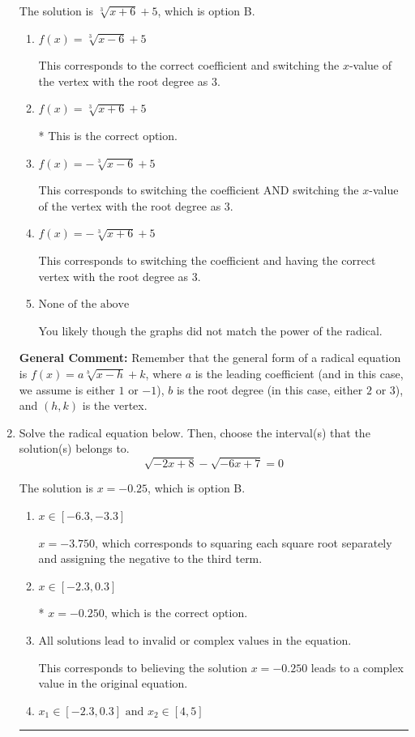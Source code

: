\documentclass{extbook}[14pt]
\newcommand{\litem}[1]{\item #1

\rule{\textwidth}{0.4pt}}
\begin{document}
\begin{enumerate}
{The solution is \( \sqrt[3]{x + 6} + 5 \), which is option B.\begin{enumerate}[label=\Alph*.]
\item \( f(x) = \sqrt[3]{x - 6} + 5 \)

This corresponds to the correct coefficient and switching the $x$-value of the vertex with the root degree as $3$.
\item \( f(x) = \sqrt[3]{x + 6} + 5 \)

* This is the correct option.
\item \( f(x) = - \sqrt[3]{x - 6} + 5 \)

This corresponds to switching the coefficient AND switching the $x$-value of the vertex with the root degree as $3$.
\item \( f(x) = - \sqrt[3]{x + 6} + 5 \)

This corresponds to switching the coefficient and having the correct vertex with the root degree as $3$.
\item \( \text{None of the above} \)

You likely though the graphs did not match the power of the radical.
\end{enumerate}

\textbf{General Comment:} Remember that the general form of a radical equation is $ f(x) = a \sqrt[b]{x - h} + k$, where $a$ is the leading coefficient (and in this case, we assume is either $1$ or $-1$), $b$ is the root degree (in this case, either $2$ or $3$), and $(h, k)$ is the vertex.
}
\litem{
Solve the radical equation below. Then, choose the interval(s) that the solution(s) belongs to.
\[ \sqrt{-2 x + 8} - \sqrt{-6 x + 7} = 0 \]

The solution is \( x = -0.25 \), which is option B.\begin{enumerate}[label=\Alph*.]
\item \( x \in [-6.3,-3.3] \)

$x = -3.750$, which corresponds to squaring each square root separately and assigning the negative to the third term.
\item \( x \in [-2.3,0.3] \)

* $x = -0.250$, which is the correct option.
\item \( \text{All solutions lead to invalid or complex values in the equation.} \)

This corresponds to believing the solution $x = -0.250$ leads to a complex value in the original equation.
\item \( x_1 \in [-2.3, 0.3] \text{ and } x_2 \in [4,5] \)


\end{enumerate}}
\end{enumerate}
\end{document}
